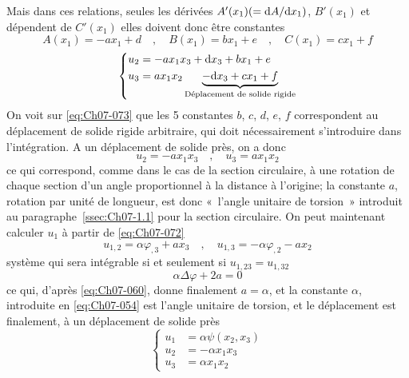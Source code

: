 Mais dans ces relations, seules les dérivées $A'(x_1) (=\mathrm{d} A /\mathrm{d} x_1)$, $B'(x_1)$ et dépendent de $C'(x_1)$ elles doivent donc être constantes 
\[
A(x_1) = -a x_1 +d \quad,\quad B(x_1) = b x_1 +e \quad,\quad C(x_1) = c x_1 +f
\]
\begin{equation}
    \left\{
    \begin{aligned}
        u_2 &= -a x_1 x_3 + \mathrm{d} x_3 + b x_1 + e\\
        u_3 &= a x_1 x_2 \underbrace{- \mathrm{d} x_3 + c x_1 + f}_{\text{Déplacement de solide rigide}}
    \end{aligned}
    \right.
    \label{eq:Ch07-073} 
\end{equation}
On voit sur \eqref{eq:Ch07-073} que les 5 constantes $b$, $c$, $d$, $e$, $f$ correspondent au déplacement de solide rigide arbitraire, qui doit nécessairement s'introduire dans l'intégration.
A un déplacement de solide près, on a donc 
\begin{equation}
    u_2 = -a x_1 x_3 \quad , \quad u_3 = a x_1 x_2
    \label{eq:Ch07-074}
\end{equation}
ce qui correspond, comme dans le cas de la section circulaire, à une rotation de chaque section d'un angle proportionnel à la distance à l'origine; la constante $a$, rotation par unité de longueur, est donc «~l'angle unitaire de torsion~» introduit au paragraphe~\ref{ssec:Ch07-1.1} pour la section circulaire.
On peut maintenant calculer $u_1$ à partir de \eqref{eq:Ch07-072} 
\begin{equation}
    u_{1,2} = \alpha \varphi_{,3} + a x_3 \quad , \quad u_{1,3} = -\alpha \varphi_{,2} - a x_2
    \label{eq:Ch07-075}
\end{equation}
système qui sera intégrable si et seulement si $u_{1,23} = u_{1,32}$
\begin{displaymath}
    \alpha \Delta \varphi + 2 a = 0
\end{displaymath}
ce qui, d'après \eqref{eq:Ch07-060}, donne finalement $a=\alpha$, et la constante $\alpha$, introduite en \eqref{eq:Ch07-054} est l'angle unitaire de torsion, et le déplacement est finalement, à un déplacement de solide près 
\begin{equation}
    \left\{
    \begin{aligned}
        u_1 &= \alpha \psi (x_2, x_3) \\
        u_2 &= - \alpha x_1 x_3 \\
        u_3 &= \alpha x_1 x_2
    \end{aligned}
    \right.
    \label{eq:Ch07-076}
\end{equation}
